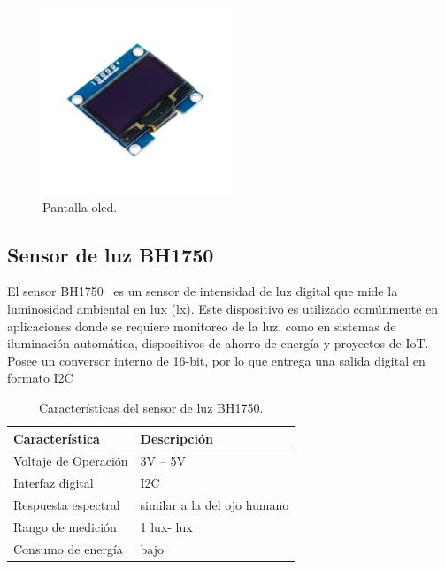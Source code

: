 \begin{figure}[h]
    \centering
    \includegraphics[width=0.5\textwidth]{img/herramientas/oled_cara.png}
    \caption{Pantalla oled.}
\end{figure}

\pagebreak

\subsection{Sensor de luz BH1750}

El sensor BH1750~\cite{manual:BH1750} es un sensor de intensidad de luz digital que mide la luminosidad ambiental en lux (lx). Este dispositivo es utilizado comúnmente en aplicaciones donde se requiere monitoreo de la luz, como en sistemas de iluminación automática, dispositivos de ahorro de energía y proyectos de IoT.
Posee un conversor interno de 16-bit, por lo que entrega una salida digital en formato I2C

\begin{table}[htbp]
\begin{center}
\caption{Características del sensor de luz BH1750.}
\begin{tabular}{|l|l|}
\hline
\rowcolor[HTML]{C0C0C0} 
\textbf{Característica} & \textbf{Descripción}\\ \hline
Voltaje de Operación &  3V – 5V \\ \hline
Interfaz digital & I2C \\ \hline
Respuesta espectral & similar a la del ojo humano \\ \hline
Rango de medición & 1 lux\quad-\quad65535 lux \\ \hline
Consumo de energía & bajo \\ \hline
\end{tabular}
\end{center}
\end{table}

